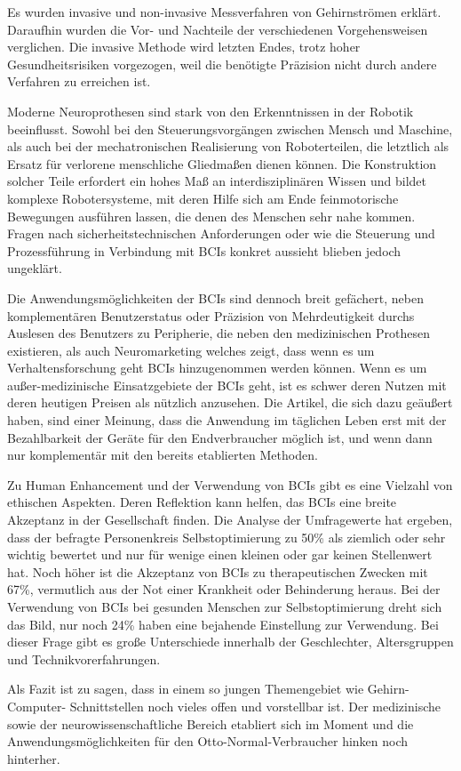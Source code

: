 \documentclass[11pt,ngerman,parskip=half]{scrartcl}
\begin{document}
Es wurden invasive und non-invasive Messverfahren von Gehirnströmen erklärt.
Daraufhin wurden die Vor- und Nachteile der verschiedenen Vorgehensweisen
verglichen. Die invasive Methode wird letzten Endes, trotz hoher
Gesundheitsrisiken vorgezogen, weil die benötigte Präzision nicht durch
andere Verfahren zu erreichen ist.

Moderne Neuroprothesen sind stark von den Erkenntnissen in der Robotik
beeinflusst. Sowohl bei den Steuerungsvorgängen zwischen Mensch und Maschine,
als auch bei der mechatronischen Realisierung von Roboterteilen, die
letztlich als Ersatz für verlorene menschliche Gliedmaßen dienen können. Die
Konstruktion solcher Teile erfordert ein hohes Maß an interdisziplinären
Wissen und bildet komplexe Robotersysteme, mit deren Hilfe sich am Ende
feinmotorische Bewegungen ausführen lassen, die denen des Menschen sehr nahe
kommen. Fragen nach sicherheitstechnischen Anforderungen oder wie die
Steuerung und Prozessführung in Verbindung mit BCIs konkret aussieht blieben
jedoch ungeklärt.

Die Anwendungsmöglichkeiten der BCIs sind dennoch breit gefächert, neben
komplementären Benutzerstatus oder Präzision von Mehrdeutigkeit durchs
Auslesen des Benutzers zu Peripherie, die neben den medizinischen Prothesen
existieren, als auch Neuromarketing welches zeigt, dass wenn es um
Verhaltensforschung geht BCIs hinzugenommen werden können. Wenn es um
außer-medizinische Einsatzgebiete der BCIs geht, ist es schwer deren Nutzen
mit deren heutigen Preisen als nützlich anzusehen. Die Artikel, die sich dazu
geäußert haben, sind einer Meinung, dass die Anwendung im täglichen Leben
erst mit der Bezahlbarkeit der Geräte für den Endverbraucher möglich ist, und
wenn dann nur komplementär mit den bereits etablierten Methoden.

Zu Human Enhancement und der Verwendung von BCIs gibt es eine Vielzahl von
ethischen Aspekten. Deren Reflektion kann helfen, das BCIs eine breite
Akzeptanz in der Gesellschaft finden. Die Analyse der Umfragewerte hat
ergeben, dass der befragte Personenkreis Selbstoptimierung zu 50\% als
ziemlich oder sehr wichtig bewertet und nur für wenige einen kleinen oder gar
keinen Stellenwert hat. Noch höher ist die Akzeptanz von BCIs zu
therapeutischen Zwecken mit 67\%, vermutlich aus der Not einer Krankheit oder
Behinderung heraus. Bei der Verwendung von BCIs bei gesunden Menschen zur
Selbstoptimierung dreht sich das Bild, nur noch 24\% haben eine bejahende
Einstellung zur Verwendung. Bei dieser Frage gibt es große Unterschiede
innerhalb der Geschlechter, Altersgruppen und Technikvorerfahrungen.

Als Fazit ist zu sagen, dass in einem so jungen Themengebiet wie
Gehirn-Computer- Schnittstellen noch vieles offen und vorstellbar ist. Der
medizinische sowie der neurowissenschaftliche Bereich etabliert sich im
Moment und die Anwendungsmöglichkeiten für den Otto-Normal-Verbraucher hinken
noch hinterher.

\pagebreak
\printbibliography[heading=bibintoc]
\end{document}
